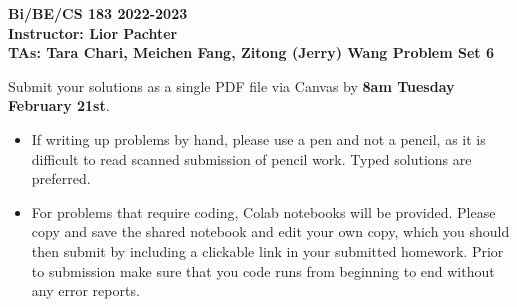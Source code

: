 \documentclass[11pt]{exam}
\begin{document}
\begin{center}

     \textbf{Bi/BE/CS 183 2022-2023\\ Instructor: Lior Pachter\\ TAs: Tara Chari, Meichen Fang, Zitong (Jerry) Wang \vskip 0.15in Problem Set 6}

\end{center}
Submit your solutions as a single PDF file via Canvas by {\bf 8am Tuesday February 21st}. 
\begin{itemize}
  \item If writing up problems by hand, please use a pen and not a pencil, as it is difficult to read scanned submission of pencil work. Typed solutions are preferred.
  \item For problems that require coding, Colab notebooks will be provided. Please copy and save the shared notebook and edit your own copy, which you should then submit by including a clickable link in your submitted homework. Prior to submission make sure that you code runs from beginning to end without any error reports.
  \end{itemize}
  
  
  
\end{document}
